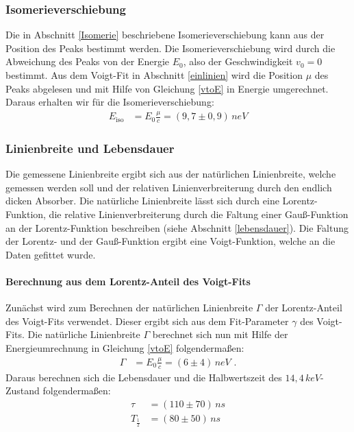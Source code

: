 \subsubsection{Isomerieverschiebung}
Die in Abschnitt \ref{Isomerie} beschriebene Isomerieverschiebung kann aus der Position des Peaks bestimmt werden. Die Isomerieverschiebung wird durch die Abweichung des Peaks von der Energie $E_0$, also der Geschwindigkeit $v_0=0$ bestimmt. Aus dem Voigt-Fit in Abschnitt \ref{einlinien} wird die Position $\mu$ des Peaks abgelesen und mit Hilfe von Gleichung \ref{vtoE} in Energie umgerechnet. Daraus erhalten wir für die Isomerieverschiebung:
\begin{align}
	E_\mathrm{iso}&=E_0\frac{\mu}{c}=(9,7\pm0,9)\,\si{neV}
\end{align}
\subsubsection{Linienbreite und Lebensdauer}
Die gemessene Linienbreite ergibt sich aus der natürlichen Linienbreite, welche gemessen werden soll und der relativen Linienverbreiterung durch den endlich dicken Absorber. Die natürliche Linienbreite lässt sich durch eine Lorentz-Funktion, die relative Linienverbreiterung durch die Faltung einer Gauß-Funktion an der Lorentz-Funktion beschreiben (siehe Abschnitt \ref{lebensdauer}). Die Faltung der Lorentz- und der Gauß-Funktion ergibt eine Voigt-Funktion, welche an die Daten gefittet wurde.
\paragraph{Berechnung aus dem Lorentz-Anteil des Voigt-Fits}
Zunächst wird zum Berechnen der natürlichen Linienbreite $\Gamma$ der Lorentz-Anteil des Voigt-Fits verwendet. Dieser ergibt sich aus dem Fit-Parameter $\gamma$ des Voigt-Fits. Die natürliche Linienbreite $\Gamma$ berechnet sich nun mit Hilfe der Energieumrechnung in Gleichung \ref{vtoE} folgendermaßen:
\begin{align}
	\Gamma&=E_0\frac{\mu}{c}=(6\pm4)\,\si{neV}\text{ .}
\end{align}
Daraus berechnen sich die Lebensdauer und die Halbwertszeit des $14,4\,\si{keV}$-Zustand folgendermaßen:
\begin{align}
	\tau&=(110\pm70)\,\si{ns}\\
	T_{\frac12}&=(80\pm50)\,\si{ns}
\end{align}
